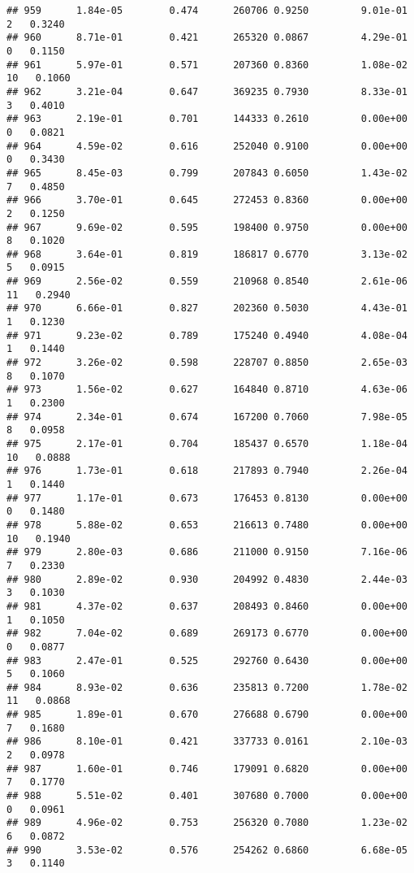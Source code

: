 \documentclass[
]{article}
\begin{document}
\begin{verbatim}
## 959      1.84e-05        0.474      260706 0.9250         9.01e-01   2   0.3240
## 960      8.71e-01        0.421      265320 0.0867         4.29e-01   0   0.1150
## 961      5.97e-01        0.571      207360 0.8360         1.08e-02  10   0.1060
## 962      3.21e-04        0.647      369235 0.7930         8.33e-01   3   0.4010
## 963      2.19e-01        0.701      144333 0.2610         0.00e+00   0   0.0821
## 964      4.59e-02        0.616      252040 0.9100         0.00e+00   0   0.3430
## 965      8.45e-03        0.799      207843 0.6050         1.43e-02   7   0.4850
## 966      3.70e-01        0.645      272453 0.8360         0.00e+00   2   0.1250
## 967      9.69e-02        0.595      198400 0.9750         0.00e+00   8   0.1020
## 968      3.64e-01        0.819      186817 0.6770         3.13e-02   5   0.0915
## 969      2.56e-02        0.559      210968 0.8540         2.61e-06  11   0.2940
## 970      6.66e-01        0.827      202360 0.5030         4.43e-01   1   0.1230
## 971      9.23e-02        0.789      175240 0.4940         4.08e-04   1   0.1440
## 972      3.26e-02        0.598      228707 0.8850         2.65e-03   8   0.1070
## 973      1.56e-02        0.627      164840 0.8710         4.63e-06   1   0.2300
## 974      2.34e-01        0.674      167200 0.7060         7.98e-05   8   0.0958
## 975      2.17e-01        0.704      185437 0.6570         1.18e-04  10   0.0888
## 976      1.73e-01        0.618      217893 0.7940         2.26e-04   1   0.1440
## 977      1.17e-01        0.673      176453 0.8130         0.00e+00   0   0.1480
## 978      5.88e-02        0.653      216613 0.7480         0.00e+00  10   0.1940
## 979      2.80e-03        0.686      211000 0.9150         7.16e-06   7   0.2330
## 980      2.89e-02        0.930      204992 0.4830         2.44e-03   3   0.1030
## 981      4.37e-02        0.637      208493 0.8460         0.00e+00   1   0.1050
## 982      7.04e-02        0.689      269173 0.6770         0.00e+00   0   0.0877
## 983      2.47e-01        0.525      292760 0.6430         0.00e+00   5   0.1060
## 984      8.93e-02        0.636      235813 0.7200         1.78e-02  11   0.0868
## 985      1.89e-01        0.670      276688 0.6790         0.00e+00   7   0.1680
## 986      8.10e-01        0.421      337733 0.0161         2.10e-03   2   0.0978
## 987      1.60e-01        0.746      179091 0.6820         0.00e+00   7   0.1770
## 988      5.51e-02        0.401      307680 0.7000         0.00e+00   0   0.0961
## 989      4.96e-02        0.753      256320 0.7080         1.23e-02   6   0.0872
## 990      3.53e-02        0.576      254262 0.6860         6.68e-05   3   0.1140

\end{verbatim}
\end{document}
